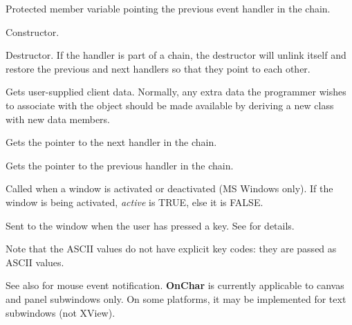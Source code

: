 
Protected member variable pointing the previous event handler in the chain.



Constructor.



Destructor. If the handler is part of a chain, the destructor will
unlink itself and restore the previous and next handlers so that they point to
each other.



Gets user-supplied client data.  Normally, any extra data the programmer wishes
to associate with the object should be made available by deriving a new class
with new data members.



Gets the pointer to the next handler in the chain.



Gets the pointer to the previous handler in the chain.



Called when a window is activated or deactivated (MS Windows
only). If the window is being activated, {\it active} is TRUE, else it
is FALSE.

\label{wxevthandleronchar}


Sent to the window when the user has pressed a key. See  for
details.

Note that the ASCII values do not have explicit key codes: they are passed as ASCII
values.

See also  for mouse event notification. {\bf OnChar} is
currently applicable to canvas and panel subwindows only. On some platforms, it may
be implemented for text subwindows (not XView).


